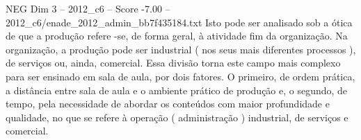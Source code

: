 \begin{textsample}{NEG Dim 3 – 2012\_c6 – Score -7.00 – 2012\_c6/enade\_2012\_admin\_bb7f435184.txt}
Isto pode ser analisado sob a ótica de que a produção refere -se, de forma geral, à atividade fim da organização.
Na organização, a produção pode ser industrial ( nos seus mais diferentes processos ), de serviços ou, ainda, comercial.
Essa divisão torna este campo mais complexo para ser ensinado em sala de aula, por dois fatores.
O primeiro, de ordem prática, a distância entre sala de aula e o ambiente prático de produção e, o segundo, de tempo, pela necessidade de abordar os conteúdos com maior profundidade e qualidade, no que se refere à operação ( administração ) industrial, de serviços e comercial.

\end{textsample}
